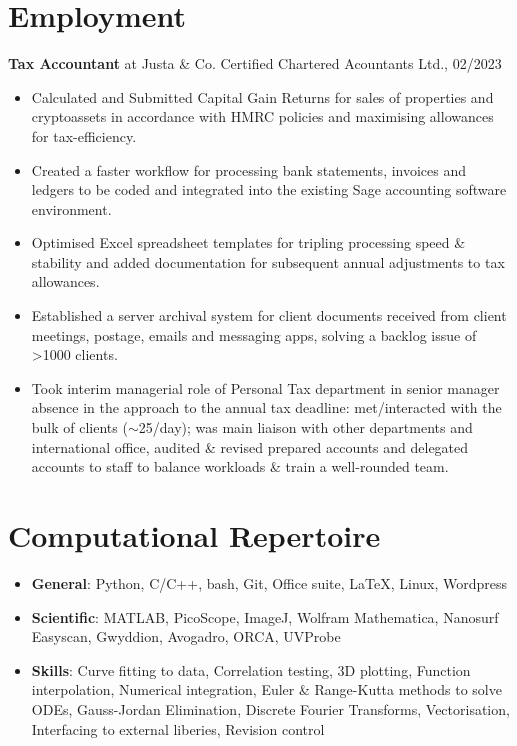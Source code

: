 \documentclass[a4paper]{article}
\begin{document}
\section{Employment}
\textbf{Tax Accountant} at  Justa \& Co. Certified Chartered Acountants Ltd., 02/2023

\begin{itemize}
	\item Calculated and Submitted Capital Gain Returns for sales of properties and cryptoassets in accordance with HMRC policies and maximising allowances for tax-efficiency.	
	\item Created a faster workflow for processing bank statements, invoices and ledgers to be coded and integrated into the existing Sage accounting software environment.
	\item Optimised Excel spreadsheet templates for tripling processing speed \& stability and added documentation for subsequent annual adjustments to tax allowances.
	\item Established a server archival system for client documents received from client meetings, postage, emails and messaging apps, solving a backlog issue of \textgreater1000 clients.
	\item Took interim managerial role of Personal Tax department in senior manager absence in the approach to the annual tax deadline: met/interacted with the bulk of clients ($\sim$25/day); was main liaison with other departments and international office, audited \& revised prepared accounts and delegated accounts to staff to balance workloads \& train a well-rounded team.
\end{itemize}



\section{Computational Repertoire}

\begin{itemize}
	\item \textbf{General}: Python, C/C++, bash, Git, Office suite, \LaTeX{}, Linux, Wordpress
	\item \textbf{Scientific}: MATLAB, PicoScope, ImageJ, Wolfram Mathematica, Nanosurf Easyscan, Gwyddion, Avogadro, ORCA, UVProbe
	\item \textbf{Skills}: Curve fitting to data, Correlation testing, 3D plotting, Function interpolation, Numerical integration, Euler \& Range-Kutta methods to solve ODEs, Gauss-Jordan Elimination, Discrete Fourier Transforms, Vectorisation, Interfacing to external liberies, Revision control
\end{itemize}
\end{document}
